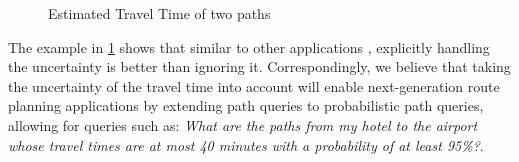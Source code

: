 
\begin{figure}[t]
    \centering
    \vspace{-0.2cm}
    \caption{Estimated Travel Time of two paths}\label{fig:motivation}
    \vspace{-0.5cm}
\end{figure}

The example in \cref{fig:motivation} shows that similar to other applications \cite{Sarma08}, explicitly handling the uncertainty is better than ignoring it. Correspondingly, we believe that taking the uncertainty of the travel time into account will enable next-generation route planning applications by extending path queries to probabilistic path queries, allowing for queries such as:  \textit{What are the paths from my hotel to the airport whose travel times are at most 40 minutes with a probability of at least 95\%?}. 

